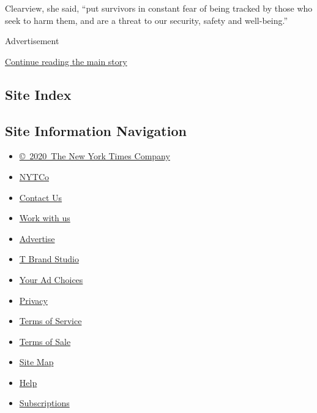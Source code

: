 Clearview, she said, ``put survivors in constant fear of being tracked
by those who seek to harm them, and are a threat to our security, safety
and well-being.''

Advertisement

\protect\hyperlink{after-bottom}{Continue reading the main story}

\hypertarget{site-index}{%
\subsection{Site Index}\label{site-index}}

\hypertarget{site-information-navigation}{%
\subsection{Site Information
Navigation}\label{site-information-navigation}}

\begin{itemize}
\tightlist
\item
  \href{https://help.nytimes.com/hc/en-us/articles/115014792127-Copyright-notice}{©~2020~The
  New York Times Company}
\end{itemize}

\begin{itemize}
\tightlist
\item
  \href{https://www.nytco.com/}{NYTCo}
\item
  \href{https://help.nytimes.com/hc/en-us/articles/115015385887-Contact-Us}{Contact
  Us}
\item
  \href{https://www.nytco.com/careers/}{Work with us}
\item
  \href{https://nytmediakit.com/}{Advertise}
\item
  \href{http://www.tbrandstudio.com/}{T Brand Studio}
\item
  \href{https://www.nytimes.com/privacy/cookie-policy\#how-do-i-manage-trackers}{Your
  Ad Choices}
\item
  \href{https://www.nytimes.com/privacy}{Privacy}
\item
  \href{https://help.nytimes.com/hc/en-us/articles/115014893428-Terms-of-service}{Terms
  of Service}
\item
  \href{https://help.nytimes.com/hc/en-us/articles/115014893968-Terms-of-sale}{Terms
  of Sale}
\item
  \href{https://spiderbites.nytimes.com}{Site Map}
\item
  \href{https://help.nytimes.com/hc/en-us}{Help}
\item
  \href{https://www.nytimes.com/subscription?campaignId=37WXW}{Subscriptions}
\end{itemize}
